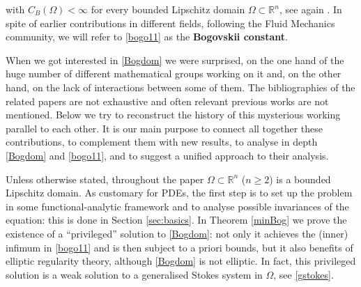 \documentclass[11pt]{article}
\theoremstyle{plain}
\theoremstyle{definition}
\numberwithin{equation}{section}
\newcommand{\R}{\mathbb{R}}
\begin{document}
with $C_B(\Omega) < \infty$ for every bounded Lipschitz domain $\Omega \subset \mathbb{R}^n$, see again
\cite[Theorem III.3.1]{galdi2011introduction}. In spite of earlier contributions in different fields, following the Fluid Mechanics community,
we will refer to \eqref{bogo11} as the {\bf Bogovskii constant}.\par
When we got interested in \eqref{Bogdom} we were  surprised, on the one hand of the huge number of different mathematical groups
working on it and, on the other hand, on the lack of interactions between some of them. The bibliographies of the related papers are not exhaustive and often
relevant previous works are not mentioned. Below we try to reconstruct the history of this mysterious working parallel to each other.
It is our main purpose to connect all together
these contributions, to complement them with new results, to analyse in depth \eqref{Bogdom} and \eqref{bogo11},
and to suggest a unified approach to their analysis.\par
Unless otherwise stated, throughout the paper $\Omega\subset\R^n$ ($n\ge2$) is a bounded Lipschitz domain. As customary for PDEs,
the first step is to set up the problem in some functional-analytic framework and to analyse possible invariances of the equation:
this is done in Section \ref{sec:basics}. In Theorem \ref{minBog} we prove the existence of a ``privileged'' solution to \eqref{Bogdom}:
not only it achieves the (inner) infimum in \eqref{bogo11} and is then subject to a priori bounds, but it also benefits of elliptic
regularity theory, although \eqref{Bogdom} is not elliptic. In fact, this privileged solution is a weak solution to a generalised Stokes system in $\Omega$, see \eqref{gstokes}.
\end{document}
